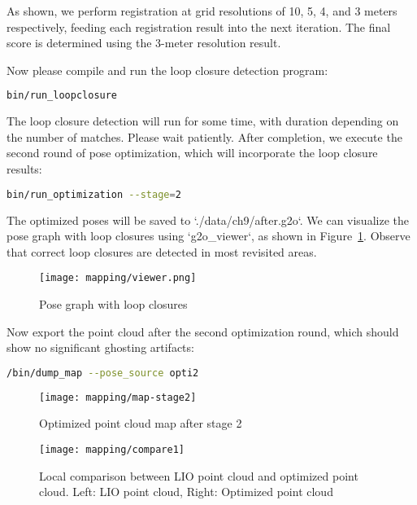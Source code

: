 As shown, we perform registration at grid resolutions of 10, 5, 4, and 3 meters respectively, feeding each registration result into the next iteration. The final score is determined using the 3-meter resolution result.

Now please compile and run the loop closure detection program:
\begin{lstlisting}[language=sh,caption=Terminal command:]
bin/run_loopclosure
\end{lstlisting}

The loop closure detection will run for some time, with duration depending on the number of matches. Please wait patiently. After completion, we execute the second round of pose optimization, which will incorporate the loop closure results:
\begin{lstlisting}[language=sh,caption=Terminal command:]
bin/run_optimization --stage=2
\end{lstlisting}

The optimized poses will be saved to `./data/ch9/after.g2o`. We can visualize the pose graph with loop closures using `g2o_viewer`, as shown in Figure~\ref{fig:loop-closure-viewer}. Observe that correct loop closures are detected in most revisited areas.

\begin{figure}
	\centering
	\texttt{[image: mapping/viewer.png]}
	\caption{Pose graph with loop closures}
	\label{fig:loop-closure-viewer}
\end{figure}

Now export the point cloud after the second optimization round, which should show no significant ghosting artifacts:
\begin{lstlisting}[language=sh,caption=Terminal command:]
/bin/dump_map --pose_source opti2
\end{lstlisting}

\begin{figure}
	\centering
	\texttt{[image: mapping/map-stage2]}
	\caption{Optimized point cloud map after stage 2}
	\label{fig:map-stage2}
\end{figure}

\begin{figure}
	\centering
	\texttt{[image: mapping/compare1]}
	\caption{Local comparison between LIO point cloud and optimized point cloud. Left: LIO point cloud, Right: Optimized point cloud}
	\label{fig:map-compare}
\end{figure}

